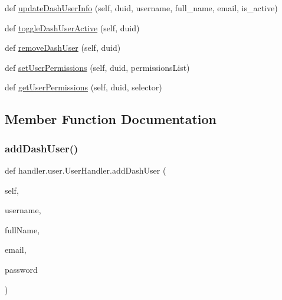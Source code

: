\begin{DoxyCompactItemize}
\item 
def \hyperlink{classhandler_1_1user_1_1_user_handler_ae252ab004847bf2c18292d5ff166a945}{update\+Dash\+User\+Info} (self, duid, username, full\+\_\+name, email, is\+\_\+active)
\item 
def \hyperlink{classhandler_1_1user_1_1_user_handler_aa98936c6961b8de393b8fd3f76882170}{toggle\+Dash\+User\+Active} (self, duid)
\item 
def \hyperlink{classhandler_1_1user_1_1_user_handler_ac698bb4b5305f31845db90f0932e95ad}{remove\+Dash\+User} (self, duid)
\item 
def \hyperlink{classhandler_1_1user_1_1_user_handler_a0c8766b4b476bc123a2306aeccd2b52c}{set\+User\+Permissions} (self, duid, permissions\+List)
\item 
def \hyperlink{classhandler_1_1user_1_1_user_handler_aa8e4dd85347c5126bb48383db010fa39}{get\+User\+Permissions} (self, duid, selector)
\end{DoxyCompactItemize}


\subsection{Member Function Documentation}
\mbox{\label{classhandler_1_1user_1_1_user_handler_a3d1e4cb462752aa66af5950b89c1feed}} 
\subsubsection{\texorpdfstring{add\+Dash\+User()}{addDashUser()}}
{\footnotesize\ttfamily def handler.\+user.\+User\+Handler.\+add\+Dash\+User (\begin{DoxyParamCaption}\item[{}]{self,  }\item[{}]{username,  }\item[{}]{full\+Name,  }\item[{}]{email,  }\item[{}]{password }\end{DoxyParamCaption})}

